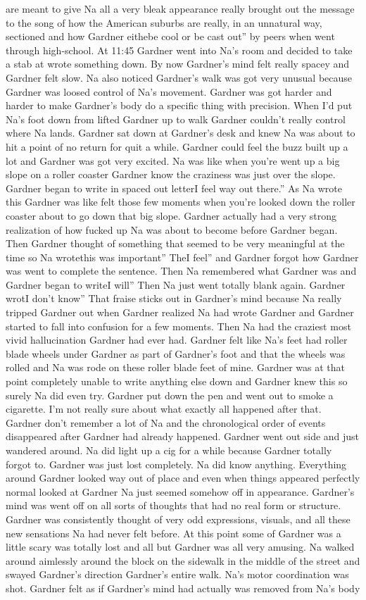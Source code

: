 \documentclass[12pt]{book}
\begin{document}
are meant to give Na all a very bleak appearance really brought out the message to the song of how the American suburbs are really, in an unnatural way, sectioned and how Gardner eithebe cool or be cast out'' by peers when went through high-school. At 11:45 Gardner went into Na's room and decided to take a stab at wrote something down. By now Gardner's mind felt really spacey and Gardner felt slow. Na also noticed Gardner's walk was got very unusual because Gardner was loosed control of Na's movement. Gardner was got harder and harder to make Gardner's body do a specific thing with precision. When I'd put Na's foot down from lifted Gardner up to walk Gardner couldn't really control where Na lands. Gardner sat down at Gardner's desk and knew Na was about to hit a point of no return for quit a while. Gardner could feel the buzz built up a lot and Gardner was got very excited. Na was like when you're went up a big slope on a roller coaster Gardner know the craziness was just over the slope. Gardner began to write in spaced out letterI feel way out there.'' As Na wrote this Gardner was like felt those few moments when you're looked down the roller coaster about to go down that big slope. Gardner actually had a very strong realization of how fucked up Na was about to become before Gardner began. Then Gardner thought of something that seemed to be very meaningful at the time so Na wrotethis was important'' TheI feel'' and Gardner forgot how Gardner was went to complete the sentence. Then Na remembered what Gardner was and Gardner began to writeI will'' Then Na just went totally blank again. Gardner wrotI don't know'' That fraise sticks out in Gardner's mind because Na really tripped Gardner out when Gardner realized Na had wrote Gardner and Gardner started to fall into confusion for a few moments. Then Na had the craziest most vivid hallucination Gardner had ever had. Gardner felt like Na's feet had roller blade wheels under Gardner as part of Gardner's foot and that the wheels was rolled and Na was rode on these roller blade feet of mine. Gardner was at that point completely unable to write anything else down and Gardner knew this so surely Na did even try. Gardner put down the pen and went out to smoke a cigarette. I'm not really sure about what exactly all happened after that. Gardner don't remember a lot of Na and the chronological order of events disappeared after Gardner had already happened. Gardner went out side and just wandered around. Na did light up a cig for a while because Gardner totally forgot to. Gardner was just lost completely. Na did know anything. Everything around Gardner looked way out of place and even when things appeared perfectly normal looked at Gardner Na just seemed somehow off in appearance. Gardner's mind was went off on all sorts of thoughts that had no real form or structure. Gardner was consistently thought of very odd expressions, visuals, and all these new sensations Na had never felt before. At this point some of Gardner was a little scary was totally lost and all but Gardner was all very amusing. Na walked around aimlessly around the block on the sidewalk in the middle of the street and swayed Gardner's direction Gardner's entire walk. Na's motor coordination was shot. Gardner felt as if Gardner's mind had actually was removed from Na's body 
\end{document}
